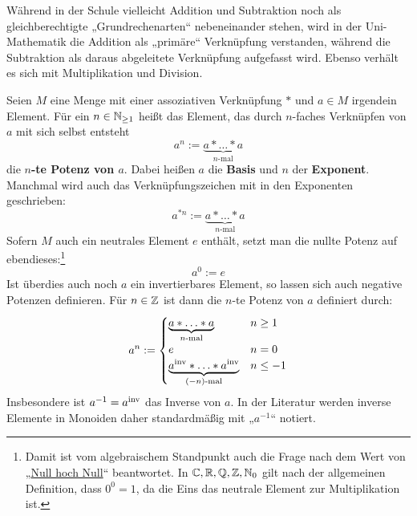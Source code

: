 \begin{bem}
    Während in der Schule vielleicht Addition und Subtraktion noch als gleichberechtigte „Grundrechenarten“ nebeneinander stehen, wird in der Uni-Mathematik die Addition als „primäre“ Verknüpfung verstanden, während die Subtraktion als daraus abgeleitete Verknüpfung aufgefasst wird. Ebenso verhält es sich mit Multiplikation und Division.
\end{bem}


\begin{de}[* Potenzen] \label{def:potenz}  
    Seien $M$ eine Menge mit einer assoziativen Verknüpfung $*$ und $a\in M$ irgendein Element. Für ein $n\in \mathbb N_{\ge 1}$ heißt das Element, das durch $n$-faches Verknüpfen von $a$ mit sich selbst entsteht
    \[ a^n := \underbrace{a * \ldots * a}_{n\text{-mal}} \]
    die \textbf{$n$-te Potenz von $a$}. Dabei heißen $a$ die \textbf{Basis} und $n$ der \textbf{Exponent}. Manchmal wird auch das Verknüpfungszeichen mit in den Exponenten geschrieben:
            \[ a^{*n} := \underbrace{a * \ldots * a}_{n\text{-mal}} \]
    Sofern $M$ auch ein neutrales Element $e$ enthält, setzt man die nullte Potenz auf ebendieses:\footnote{Damit ist vom algebraischem Standpunkt auch die Frage nach dem Wert von „\href{https://en.wikipedia.org/wiki/Zero_to_the_power_of_zero}{Null hoch Null}“ beantwortet. In $\mathbb C,\mathbb R,\mathbb Q,\mathbb Z,\mathbb N_0$ gilt nach der allgemeinen Definition, dass $0^0=1$, da die Eins das neutrale Element zur Multiplikation ist.}
        \[ a^0 := e \]
    Ist überdies auch noch $a$ ein invertierbares Element, so lassen sich auch negative Potenzen definieren. Für $n\in \mathbb Z$ ist dann die $n$-te Potenz von $a$ definiert durch:
    \begin{align*}
        a^n := \begin{cases}
            \underbrace{a* \ldots * a}_{n\text{-mal}} & n \ge 1 \\
            e & n= 0 \\
            \underbrace{a^{\mathrm{inv}} * \ldots * a^{\mathrm{inv}}}_{(-n)\text{-mal}} & n \le -1
        \end{cases}
    \end{align*}
    Insbesondere ist $a^{-1}=a^{\mathrm{inv}}$ das Inverse von $a$. In der Literatur werden inverse Elemente in Monoiden daher standardmäßig mit „$a^{-1}$“ notiert.
\end{de}

